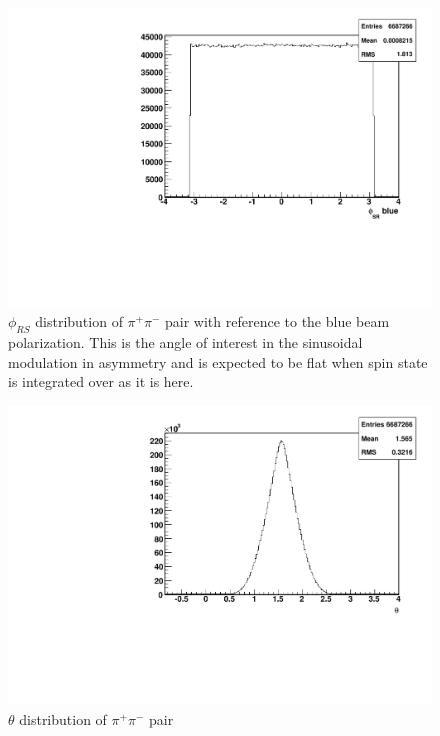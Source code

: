\documentclass[letterpaper, abstract = on,listof=totoc, bibliography=totoc]{scrreprt}
\newcommand{\phirs}{\phi_{RS}}
\newcommand{\pip}{\pi^+}
\newcommand{\pim}{\pi^-}
\newcommand{\pair}{$\pip\pim$ }
\begin{document}
\begin{figure}
\begin{center}
\includegraphics[width = .8\textwidth]{hPhiSRb}
\caption[$\phirs$ distribution of \pair pair with reference to the blue beam polarization]{$\phirs$ distribution of \pair pair with reference to the blue beam polarization. This is the angle of interest in the sinusoidal modulation in asymmetry and is expected to be flat when spin state is integrated over as it is here.}
\label{fig:phisrb}
\end{center}
\end{figure}


\begin{figure}
\begin{center}
\includegraphics[width = .8\textwidth]{hTheta}
\caption[$\theta$ distribution of \pair pair]{$\theta$ distribution of \pair pair}
\label{fig:theta}
\end{center}
\end{figure}

\clearpage %
\end{document}
